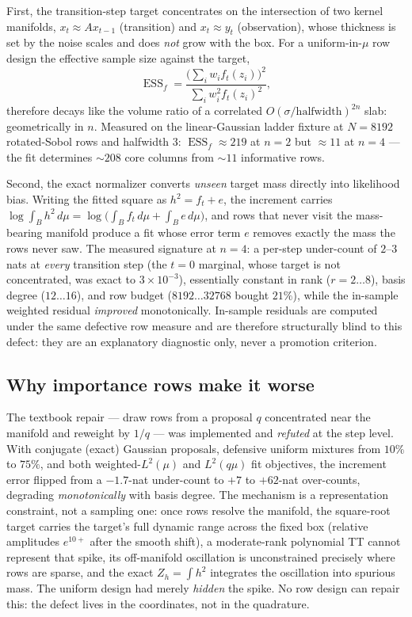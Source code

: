 First, the transition-step target concentrates on the intersection of two
kernel manifolds, \(x_t\approx A x_{t-1}\) (transition) and
\(x_t\approx y_t\) (observation), whose thickness is set by the noise scales
and does \emph{not} grow with the box.  For a uniform-in-\(\mu\) row design
the effective sample size against the target,
\begin{equation}
  \operatorname{ESS}_f
  =\frac{\bigl(\sum_i w_i f_t(z_i)\bigr)^2}{\sum_i w_i^2 f_t(z_i)^2},
  \label{eq:bf-hd-rowcov-ess}
\end{equation}
therefore decays like the volume ratio of a correlated
\(O(\sigma/\text{halfwidth})^{2n}\) slab: geometrically in \(n\).  Measured
on the linear-Gaussian ladder fixture at \(N=8192\) rotated-Sobol rows and
halfwidth \(3\): \(\operatorname{ESS}_f\approx 219\) at \(n=2\) but
\(\approx 11\) at \(n=4\) --- the fit determines
\({\sim}208\) core columns from \({\sim}11\) informative rows.

Second, the exact normalizer converts \emph{unseen} target mass directly
into likelihood bias.  Writing the fitted square as
\(h^2=f_t+e\), the increment carries
\(\log\int_B h^2\,d\mu=\log\bigl(\int_B f_t\,d\mu+\int_B e\,d\mu\bigr)\),
and rows that never visit the mass-bearing manifold produce a fit whose
error term \(e\) removes exactly the mass the rows never saw.  The measured
signature at \(n=4\): a per-step under-count of \(2\)--\(3\) nats at
\emph{every} transition step (the \(t=0\) marginal, whose target is not
concentrated, was exact to \(3\times10^{-3}\)), essentially constant in
rank (\(r=2\ldots8\)), basis degree (\(12\ldots16\)), and row budget
(\(8192\ldots32768\) bought \(21\%\)), while the in-sample weighted residual
\emph{improved} monotonically.  In-sample residuals are computed under the
same defective row measure and are therefore structurally blind to this
defect: they are an explanatory diagnostic only, never a promotion
criterion.

\subsection{Why importance rows make it worse}

The textbook repair --- draw rows from a proposal \(q\) concentrated near
the manifold and reweight by \(1/q\) --- was implemented and \emph{refuted}
at the step level.  With conjugate (exact) Gaussian proposals, defensive
uniform mixtures from \(10\%\) to \(75\%\), and both weighted-\(L^2(\mu)\)
and \(L^2(q\mu)\) fit objectives, the increment error flipped from a
\(-1.7\)-nat under-count to \(+7\) to \(+62\)-nat over-counts, degrading
\emph{monotonically} with basis degree.  The mechanism is a representation
constraint, not a sampling one: once rows resolve the manifold, the
square-root target carries the target's full dynamic range across the fixed
box (relative amplitudes \(e^{10+}\) after the smooth shift), a moderate-rank
polynomial TT cannot represent that spike, its off-manifold oscillation is
unconstrained precisely where rows are sparse, and the exact
\(Z_h=\int h^2\) integrates the oscillation into spurious mass.  The uniform
design had merely \emph{hidden} the spike.  No row design can repair this:
the defect lives in the coordinates, not in the quadrature.

